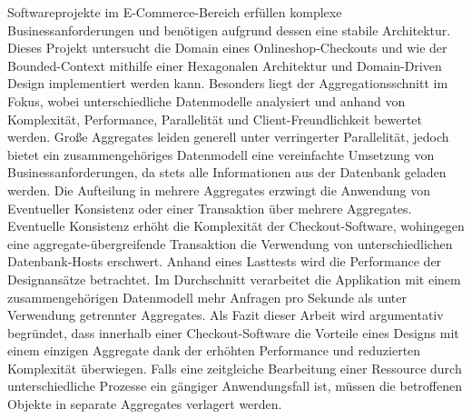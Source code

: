 {{{			Softwareprojekte im E-Commerce-Bereich erfüllen komplexe Businessanforderungen und benötigen aufgrund dessen eine stabile Architektur. Dieses Projekt untersucht die Domain eines Onlineshop-Checkouts und wie der Bounded-Context mithilfe einer Hexagonalen Architektur und Domain-Driven Design implementiert werden kann. Besonders liegt der Aggregationsschnitt im Fokus, wobei unterschiedliche Datenmodelle analysiert und anhand von Komplexität, Performance, Parallelität und Client-Freundlichkeit bewertet werden. Große Aggregates leiden generell unter verringerter Parallelität, jedoch bietet ein zusammengehöriges Datenmodell eine vereinfachte Umsetzung von Businessanforderungen, da stets alle Informationen aus der Datenbank geladen werden. Die Aufteilung in mehrere Aggregates erzwingt die Anwendung von Eventueller Konsistenz oder einer Transaktion über mehrere Aggregates. Eventuelle Konsistenz erhöht die Komplexität der Checkout-Software, wohingegen eine aggregate-übergreifende Transaktion die Verwendung von unterschiedlichen Datenbank-Hosts erschwert. Anhand eines Lasttests wird die Performance der Designansätze betrachtet. Im Durchschnitt verarbeitet die Applikation mit einem zusammengehörigen Datenmodell mehr Anfragen pro Sekunde als unter Verwendung getrennter Aggregates. Als Fazit dieser Arbeit wird argumentativ begründet, dass innerhalb einer Checkout-Software die Vorteile eines Designs mit einem einzigen Aggregate dank der erhöhten Performance und reduzierten Komplexität überwiegen. Falls eine zeitgleiche Bearbeitung einer Ressource durch unterschiedliche Prozesse ein gängiger Anwendungsfall ist, müssen die betroffenen Objekte in separate Aggregates verlagert werden.
			
			\par}
		\vfill
	}
	
	
	
	\pagebreak

	\large
	
	{
		\vspace*{\fill}
		\vfill
	}
	
		
	\pagebreak
	
\par}